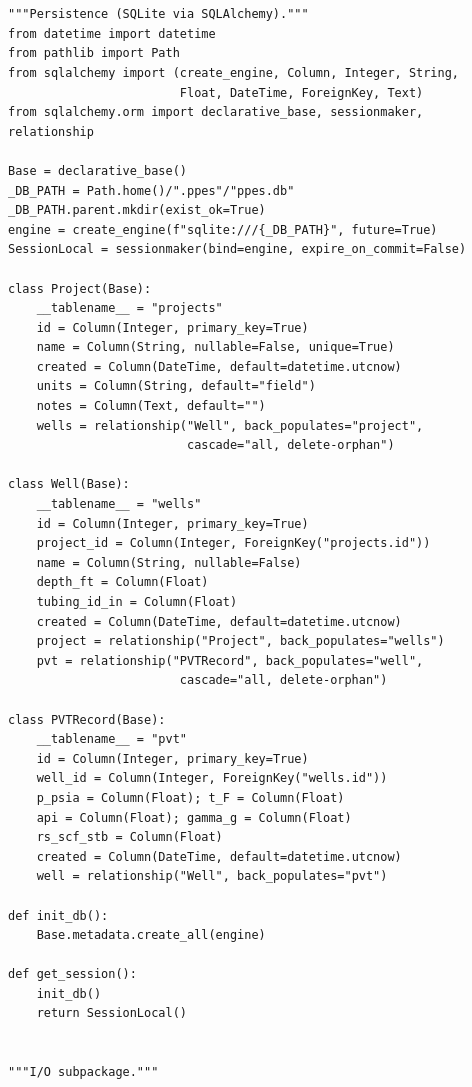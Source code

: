 \documentclass[10pt,a4paper,openany]{book}
\begin{document}
\chapter{}
\begin{lstlisting}
"""Persistence (SQLite via SQLAlchemy)."""
from datetime import datetime
from pathlib import Path
from sqlalchemy import (create_engine, Column, Integer, String,
                        Float, DateTime, ForeignKey, Text)
from sqlalchemy.orm import declarative_base, sessionmaker, relationship

Base = declarative_base()
_DB_PATH = Path.home()/".ppes"/"ppes.db"
_DB_PATH.parent.mkdir(exist_ok=True)
engine = create_engine(f"sqlite:///{_DB_PATH}", future=True)
SessionLocal = sessionmaker(bind=engine, expire_on_commit=False)

class Project(Base):
    __tablename__ = "projects"
    id = Column(Integer, primary_key=True)
    name = Column(String, nullable=False, unique=True)
    created = Column(DateTime, default=datetime.utcnow)
    units = Column(String, default="field")
    notes = Column(Text, default="")
    wells = relationship("Well", back_populates="project",
                         cascade="all, delete-orphan")

class Well(Base):
    __tablename__ = "wells"
    id = Column(Integer, primary_key=True)
    project_id = Column(Integer, ForeignKey("projects.id"))
    name = Column(String, nullable=False)
    depth_ft = Column(Float)
    tubing_id_in = Column(Float)
    created = Column(DateTime, default=datetime.utcnow)
    project = relationship("Project", back_populates="wells")
    pvt = relationship("PVTRecord", back_populates="well",
                        cascade="all, delete-orphan")

class PVTRecord(Base):
    __tablename__ = "pvt"
    id = Column(Integer, primary_key=True)
    well_id = Column(Integer, ForeignKey("wells.id"))
    p_psia = Column(Float); t_F = Column(Float)
    api = Column(Float); gamma_g = Column(Float)
    rs_scf_stb = Column(Float)
    created = Column(DateTime, default=datetime.utcnow)
    well = relationship("Well", back_populates="pvt")

def init_db():
    Base.metadata.create_all(engine)

def get_session():
    init_db()
    return SessionLocal()
\end{lstlisting}

\chapter{}
\begin{lstlisting}
"""I/O subpackage."""
\end{lstlisting}
\end{document}
